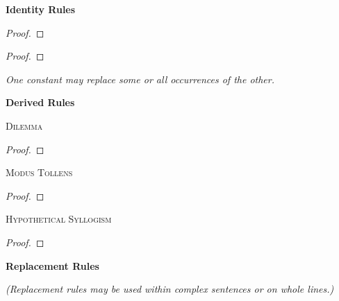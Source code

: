 \twocolumn %


{\large \bf Identity Rules}

\begin{proof}
	 
\end{proof}

\begin{proof}
	 
	 
\end{proof}

\begin{footnotesize}\emph{One constant may replace some or all occurrences of the other.}
\end{footnotesize}






{\large \bf Derived Rules}

\textsc{Dilemma}

\begin{proof}
	 
\end{proof}

\textsc{Modus Tollens}

\begin{proof}
	 
\end{proof}

\textsc{Hypothetical Syllogism}

\begin{proof}
\end{proof}

\newpage

{\large \bf Replacement Rules}

\begin{footnotesize}\emph{(Replacement rules may be used within complex sentences or on whole lines.)}\end{footnotesize}

